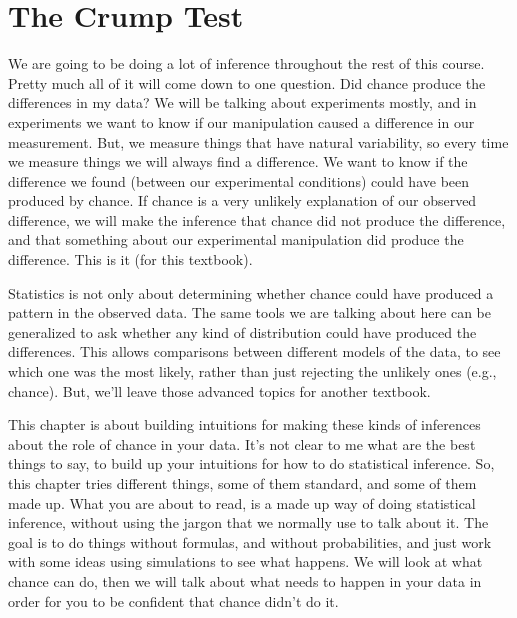 \documentclass[
  letterpaper,
  DIV=11,
  numbers=noendperiod]{scrreprt}
\begin{document}
\section{The Crump Test}\label{the-crump-test}

We are going to be doing a lot of inference throughout the rest of this
course. Pretty much all of it will come down to one question. Did chance
produce the differences in my data? We will be talking about experiments
mostly, and in experiments we want to know if our manipulation caused a
difference in our measurement. But, we measure things that have natural
variability, so every time we measure things we will always find a
difference. We want to know if the difference we found (between our
experimental conditions) could have been produced by chance. If chance
is a very unlikely explanation of our observed difference, we will make
the inference that chance did not produce the difference, and that
something about our experimental manipulation did produce the
difference. This is it (for this textbook).

\begin{tcolorbox}[enhanced jigsaw, breakable, colback=white, opacitybacktitle=0.6, coltitle=black, toprule=.15mm, bottomtitle=1mm, leftrule=.75mm, arc=.35mm, title=\textcolor{quarto-callout-note-color}{\faInfo}\hspace{0.5em}{Note}, opacityback=0, colframe=quarto-callout-note-color-frame, left=2mm, titlerule=0mm, toptitle=1mm, colbacktitle=quarto-callout-note-color!10!white, rightrule=.15mm, bottomrule=.15mm]

Statistics is not only about determining whether chance could have
produced a pattern in the observed data. The same tools we are talking
about here can be generalized to ask whether any kind of distribution
could have produced the differences. This allows comparisons between
different models of the data, to see which one was the most likely,
rather than just rejecting the unlikely ones (e.g., chance). But, we'll
leave those advanced topics for another textbook.

\end{tcolorbox}

This chapter is about building intuitions for making these kinds of
inferences about the role of chance in your data. It's not clear to me
what are the best things to say, to build up your intuitions for how to
do statistical inference. So, this chapter tries different things, some
of them standard, and some of them made up. What you are about to read,
is a made up way of doing statistical inference, without using the
jargon that we normally use to talk about it. The goal is to do things
without formulas, and without probabilities, and just work with some
ideas using simulations to see what happens. We will look at what chance
can do, then we will talk about what needs to happen in your data in
order for you to be confident that chance didn't do it.
\end{document}
